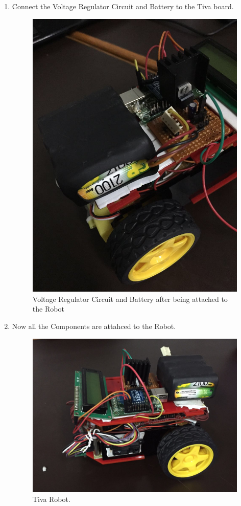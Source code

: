 \documentclass[a4paper,12pt,oneside]{book}
\begin{document}
\begin{enumerate}
\item Connect the Voltage Regulator Circuit and Battery to the Tiva board.
\begin{figure}[h]
        \centering
        \includegraphics[scale=0.16]{battery_a}
        \caption{ Voltage Regulator Circuit and Battery  after being attached to the Robot}
      \end{figure}

\item Now all the Components are attahced to the Robot.
\begin{figure}[h]
        \centering
        \includegraphics[scale=0.16]{robot}
        \caption{Tiva Robot.}
      \end{figure}
    \newpage
\end{enumerate}
\end{document}
